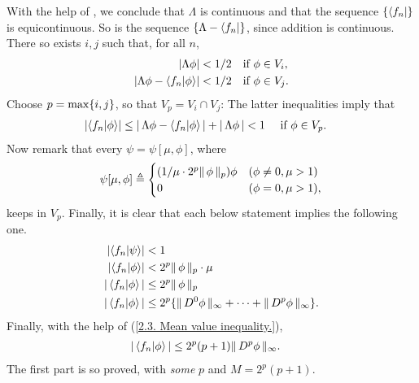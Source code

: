 %
With the help of , we conclude that %
%
  $\Lambda$ is continuous 
%
and that the sequence
%
  $\{\bra{f_n}\}$ %
%
is equicontinuous. 
%
So is the sequence %
%
  $\{\Lambda - \bra{f_n}\}$, %
%
since addition is continuous.
%
There so exists $i, j$ such that, for all $n$, 
%
  \begin{align}
    \left\lvert 
      \Lambda \phi 
    \right\rvert
      < 
    1/2 & \quad \text{if }\phi\in V_i, \\
    \left\lvert 
      \Lambda\phi - \bra{f_n}\ket{\phi} 
    \right\rvert  
      < 
    1/2 & \quad \text{if } \phi\in V_j.
  \end{align}
%
Choose $p = \max\{i, j\}$, so that $V_p = V_i \cap V_j$: %
The latter inequalities imply that %
%
  \begin{align}
    \left\lvert \bra{f_n}\ket{\phi} \right\rvert  & \leq 
      \magnitude{
        \Lambda\phi 
        - \bra{f_n }\ket{\phi} 
      }
      + 
      \magnitude{\Lambda \phi}
     < 1 \
       \quad\text{if } \phi\in V_p. %
  \end{align}
%
Now remark that every $\psi =\psi[\mu, \phi]$, where %
%
  \begin{align}
     \psi[\mu, \phi] \triangleq 
      \begin{cases}
        ({1}/{\mu \cdot 2^{p} \| \,\phi \, \|_{p}}) \phi & (\phi \neq 0, \mu > 1)\\
        0                                          & (\phi   =  0, \mu > 1),  
      \end{cases}
  \end{align}
%
keeps in $V_p$. Finally, %
it is clear that each below statement implies the following one.
%
  \begin{align}
    \lvert \langle {f_n}  | \psi \rangle \rvert &  
    < 1 \\
    \left\lvert \bra{f_n}\ket{\phi} \right\rvert &  
    < 2^{p}  \| \,\phi \, \|_{p} \cdot \mu \\
    \left\lvert\, \bra{f_n}\ket{\phi} \,\right\rvert & 
    \leq 2^{p} \| \,\phi \, \|_{p} \\
     \left\lvert\, \bra{f_n}\ket{\phi} \,\right\rvert &
     \leq 2^{p} \{
       \| \,D^0 \phi \, \|_{\infty} 
       + 
         \cdots 
      + 
        \| \,D^p \phi \, \|_{\infty}
      \}.
  \end{align}
  Finally, with the help of (\ref{2.3. Mean value inequality.}), 
  \begin{align}
    \label{2.3. Bound with p and M (theoritical).}
     \left\lvert\, \bra{f_n}\ket{\phi} \,\right\rvert &
       \leq 
      2^{p} (p+1) \| \,D^p \phi \, \|_{\infty} .
  \end{align}
%
The first part is so proved, with \textit{some} $p$ and $ M= 2^{p}(p+1)$. %
\newline\newline\noindent
%
